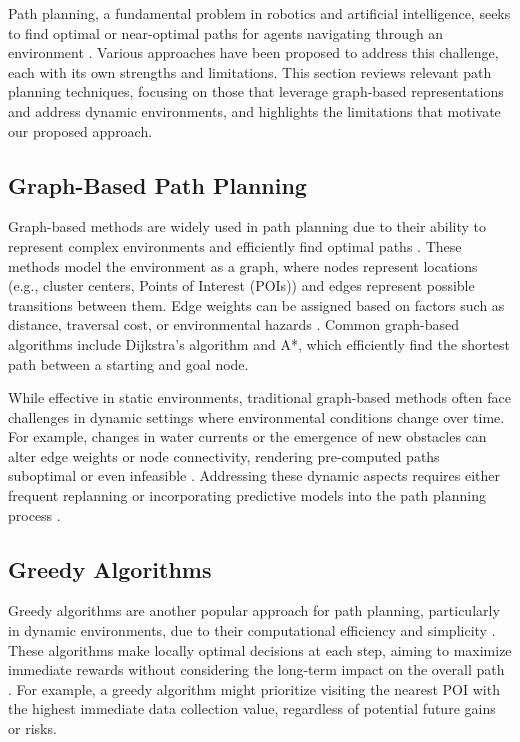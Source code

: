 \documentclass[conference]{IEEEtran}
\begin{document}
Path planning, a fundamental problem in robotics and artificial intelligence, seeks to find optimal or near-optimal paths for agents navigating through an environment \cite{lavalle2006planning}. Various approaches have been proposed to address this challenge, each with its own strengths and limitations. This section reviews relevant path planning techniques, focusing on those that leverage graph-based representations and address dynamic environments, and highlights the limitations that motivate our proposed approach.

\subsection{Graph-Based Path Planning}

Graph-based methods are widely used in path planning due to their ability to represent complex environments and efficiently find optimal paths \cite{lavalle2006planning, thrun2005probabilistic}. These methods model the environment as a graph, where nodes represent locations (e.g., cluster centers, Points of Interest (POIs)) and edges represent possible transitions between them. Edge weights can be assigned based on factors such as distance, traversal cost, or environmental hazards \cite{chassignet2007hycom}. Common graph-based algorithms include Dijkstra's algorithm and A*, which efficiently find the shortest path between a starting and goal node. 

While effective in static environments, traditional graph-based methods often face challenges in dynamic settings where environmental conditions change over time. For example, changes in water currents or the emergence of new obstacles can alter edge weights or node connectivity, rendering pre-computed paths suboptimal or even infeasible \cite{stentz1995optimal}. Addressing these dynamic aspects requires either frequent replanning or incorporating predictive models into the path planning process \cite{ferguson2006motion}. 

\subsection{Greedy Algorithms}

Greedy algorithms are another popular approach for path planning, particularly in dynamic environments, due to their computational efficiency and simplicity \cite{xu2020greedy_dynamic, mei2024multi_agent}. These algorithms make locally optimal decisions at each step, aiming to maximize immediate rewards without considering the long-term impact on the overall path \cite{wu2014path_problems}. For example, a greedy algorithm might prioritize visiting the nearest POI with the highest immediate data collection value, regardless of potential future gains or risks.
\end{document}
